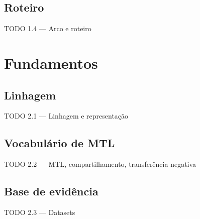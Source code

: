 \documentclass{beamer}
\begin{document}
\subsection{Roteiro}
\begin{frame}{TODO 1.4 --- Arco e roteiro}
\end{frame}


\section{Fundamentos}

\subsection{Linhagem}
\begin{frame}{TODO 2.1 --- Linhagem e representação}
\end{frame}

\subsection{Vocabulário de MTL}
\begin{frame}{TODO 2.2 --- MTL, compartilhamento, transferência negativa}
\end{frame}

\subsection{Base de evidência}
\begin{frame}{TODO 2.3 --- Datasets}
\end{frame}
\end{document}
